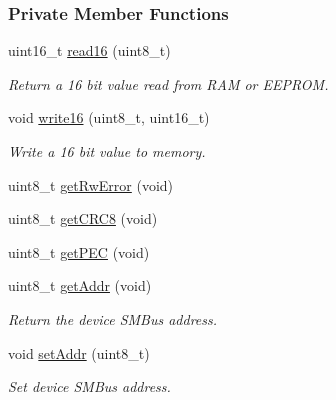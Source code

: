 \subsubsection*{Private Member Functions}
\begin{DoxyCompactItemize}
\item 
uint16\+\_\+t \mbox{\hyperlink{class_m_l_x90614_ad7fb030682918c5c9ae6292962527b44}{read16}} (uint8\+\_\+t)
\begin{DoxyCompactList}\small\item\em Return a 16 bit value read from R\+AM or E\+E\+P\+R\+OM. \end{DoxyCompactList}\item 
void \mbox{\hyperlink{class_m_l_x90614_a18cf4b5a62e225e8530a1e0f641ea027}{write16}} (uint8\+\_\+t, uint16\+\_\+t)
\begin{DoxyCompactList}\small\item\em Write a 16 bit value to memory. \end{DoxyCompactList}\item 
uint8\+\_\+t \mbox{\hyperlink{class_m_l_x90614_a785e254cb6af386a7f23ebd427b50c81}{get\+Rw\+Error}} (void)
\item 
uint8\+\_\+t \mbox{\hyperlink{class_m_l_x90614_a6635121e11e44f85945d18bb81d85b4f}{get\+C\+R\+C8}} (void)
\item 
uint8\+\_\+t \mbox{\hyperlink{class_m_l_x90614_a7bd321c53f70f4f3a96f7c6c7d4cb80e}{get\+P\+EC}} (void)
\item 
uint8\+\_\+t \mbox{\hyperlink{class_m_l_x90614_a7ba22b140f92bea70381cf3c495d4c72}{get\+Addr}} (void)
\begin{DoxyCompactList}\small\item\em Return the device S\+M\+Bus address. \end{DoxyCompactList}\item 
void \mbox{\hyperlink{class_m_l_x90614_a3d8646faede1c0adc667c54a0c95a7db}{set\+Addr}} (uint8\+\_\+t)
\begin{DoxyCompactList}\small\item\em Set device S\+M\+Bus address. \end{DoxyCompactList}\end{DoxyCompactItemize}
